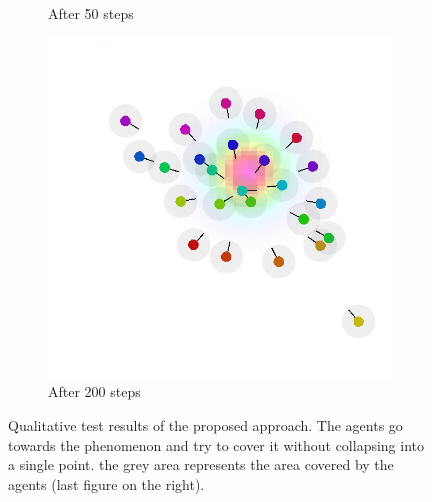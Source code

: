 \documentclass[conference]{IEEEtran}
\begin{document}
\begin{figure}[t]
\begin{subfigure}[b]{0.32\linewidth}
      \caption{After 50 steps}
      \label{fig:after}
  \end{subfigure}
  \begin{subfigure}[b]{0.32\linewidth}
      \includegraphics[width=\textwidth]{imgs/end.png}
      \caption{After 200 steps}
      \label{fig:end}
  \end{subfigure}
  \caption{Qualitative test results of the proposed approach. 
  The agents go towards the phenomenon and try to cover it without collapsing into a single point.
  the grey area represents the area covered by the agents (last figure on the right).}
  \label{fig:simulations}
\end{figure}

\end{document}
